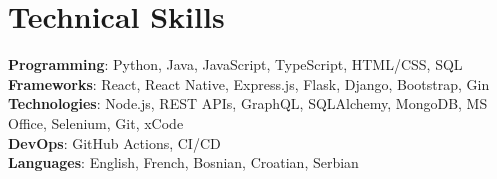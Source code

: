 \section{Technical Skills}
    \begin{itemize}[leftmargin=0.15in, label={}]
	\small{\item{
		\textbf{Programming}{: Python, Java, JavaScript, TypeScript, HTML/CSS, SQL} \\
		\textbf{Frameworks}{: React, React Native, Express.js, Flask, Django, Bootstrap, Gin} \\
		\textbf{Technologies}{: Node.js, REST APIs, GraphQL, SQLAlchemy, MongoDB, MS Office, Selenium, Git, xCode} \\
		\textbf{DevOps}{: GitHub Actions, CI/CD} \\
		\textbf{Languages}{: English, French, Bosnian, Croatian, Serbian} \\
	}}
    \end{itemize}
